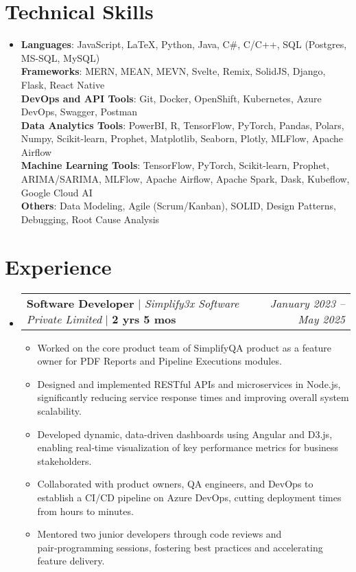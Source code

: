 \documentclass[letterpaper,10pt]{article}
\makeatletter
\newcommand{\sectionspace}{\vspace{-20pt}}
\newcommand{\subheadingtitlevspace}{\vspace{-3pt}}
\newcommand{\resumeItem}[1]{\item{#1 \vspace{-4pt}}}
\newcommand{\titleItem}[1]{\textbf{#1}}
\newcommand{\resumeProjectHeading}[2]{
    \item
    \begin{tabular*}{0.97\textwidth}{l@{\extracolsep{\fill}}r}
        #1 & \textit{ #2} \\
    \end{tabular*}\vspace{-9pt}
}
\newcommand{\resumeSubHeadingListStart}{\subheadingtitlevspace\begin{itemize}[leftmargin=0.15in, label={}]}
\newcommand{\resumeSubHeadingListEnd}{\end{itemize}}
\newcommand{\resumeItemListStart}{\begin{itemize}}
\newcommand{\resumeItemListEnd}{\end{itemize}\vspace{-8pt}}
\makeatother
\begin{document}
\section{Technical Skills}
\subheadingtitlevspace
\begin{itemize}[leftmargin=0.15in, label={}]
    \item{\titleItem{Languages}{: JavaScript, LaTeX, Python, Java, C\#, C/C++, SQL (Postgres, MS-SQL, MySQL)} \\
    \titleItem{Frameworks}{: MERN, MEAN, MEVN, Svelte, Remix, SolidJS, Django, Flask, React Native} \\
    \titleItem{DevOps and API Tools}{: Git, Docker, OpenShift, Kubernetes, Azure DevOps, Swagger, Postman} \\
    \titleItem{Data Analytics Tools}{: PowerBI, R, TensorFlow, PyTorch, Pandas, Polars, Numpy, Scikit-learn, Prophet, Matplotlib, Seaborn, Plotly, MLFlow, Apache Airflow} \\
    \titleItem{Machine Learning Tools}{: TensorFlow, PyTorch, Scikit-learn, Prophet, ARIMA/SARIMA, MLFlow, Apache Airflow, Apache Spark, Dask, Kubeflow, Google Cloud AI} \\
    \titleItem{Others}{: Data Modeling, Agile (Scrum/Kanban), SOLID, Design Patterns,  Debugging, Root Cause Analysis}}
\end{itemize}
\sectionspace

\section{Experience}

\resumeSubHeadingListStart
\resumeProjectHeading{\titleItem{Software Developer} $|$ \emph{Simplify3x Software Private Limited} $|$ \textbf{2 yrs 5 mos}}{January 2023 -- May 2025} 
    \resumeItemListStart
        \resumeItem{Worked on the core product team of SimplifyQA product as a feature owner for PDF Reports and Pipeline Executions modules.}
        \resumeItem{Designed and implemented RESTful APIs and microservices in Node.js, significantly reducing service response times and improving overall system scalability.}
        \resumeItem{Developed dynamic, data-driven dashboards using Angular and D3.js, enabling real‑time visualization of key performance metrics for business stakeholders.}
        \resumeItem{Collaborated with product owners, QA engineers, and DevOps to establish a CI/CD pipeline on Azure DevOps, cutting deployment times from hours to minutes.}
        \resumeItem{Mentored two junior developers through code reviews and pair‑programming sessions, fostering best practices and accelerating feature delivery.}
    \resumeItemListEnd
\resumeSubHeadingListEnd
\end{document}
